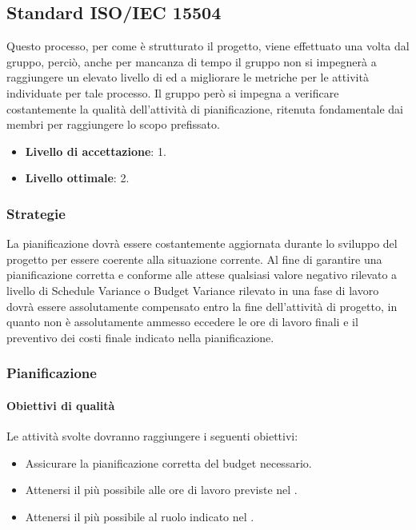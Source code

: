 \subsection{Standard ISO/IEC 15504}
Questo processo, per come è strutturato il progetto, viene effettuato una volta dal gruppo, perciò, anche per mancanza di tempo il gruppo non si impegnerà a raggiungere un elevato livello di  ed a migliorare le metriche per le attività individuate per tale processo. Il gruppo però si impegna a verificare costantemente la qualità dell'attività di pianificazione, ritenuta fondamentale dai membri per raggiungere lo scopo prefissato.
\begin{itemize}
\item \textbf{Livello di accettazione}: 1.
\item \textbf{Livello ottimale}: 2.
\end{itemize}

\subsubsection{Strategie}
La pianificazione dovrà essere costantemente aggiornata durante lo sviluppo del progetto per essere coerente alla situazione corrente. Al fine di garantire una pianificazione corretta e conforme alle attese qualsiasi valore negativo rilevato a livello di Schedule Variance o Budget Variance rilevato in una fase di lavoro dovrà essere
assolutamente compensato entro la fine dell’attività di progetto, in quanto non è assolutamente
ammesso eccedere le ore di lavoro finali e il preventivo dei costi finale indicato nella pianificazione.

\subsubsection{Pianificazione}

\paragraph{Obiettivi di qualità}
Le attività svolte dovranno raggiungere i seguenti obiettivi:
\begin{itemize}
\item Assicurare la pianificazione corretta del budget necessario.
\item Attenersi il più possibile alle ore di lavoro previste nel \PdQ.
\item Attenersi il più possibile al ruolo indicato nel \PdP.
\end{itemize}

